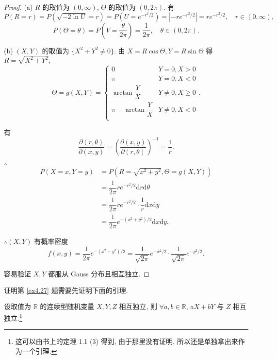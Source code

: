 \documentclass{ctexart}
\begin{document}
\begin{proof}
    (a) $R$ 的取值为 $(0,\infty)$, $\Theta$ 的取值为 $(0,2\pi)$. 有
    \[P(R=r)=P(\sqrt{-2\ln U}=r)=P(U=e^{-r^2/2})=|-re^{-r^2/2}|=re^{-r^2/2},\quad r\in(0,\infty),\]
    \[P(\Theta=\theta)=P\left(V=\dfrac{\theta}{2\pi}\right)=\dfrac{1}{2\pi},\quad\theta\in(0,2\pi).\]

    (b) $(X,Y)$ 的取值为 $\{X^2+Y^2\neq0\}$. 由 $X=R\cos\Theta,Y=R\sin\Theta$ 得 $R=\sqrt{X^2+Y^2}$,
    \[\Theta=g(X,Y)=\begin{cases}
        0 & Y=0,X>0 \\
        \pi & Y=0,X<0 \\
        \arctan\dfrac{Y}{X} & Y\neq0,X\geq0 \\
        \pi-\arctan\dfrac{Y}{X} & Y\neq0,X<0 \\
    \end{cases}.\]

    有
    \[\dfrac{\partial(r,\theta)}{\partial(x,y)}=\left(\dfrac{\partial(x,y)}{\partial(r,\theta)}\right)^{-1}=\dfrac{1}{r}.\]

    $\therefore$
    \begin{align*}
        P(X=x,Y=y) & =P(R=\sqrt{x^2+y^2},\Theta=g(X,Y)) \\
        & =\dfrac{1}{2\pi}re^{-r^2/2}\mathrm{d}r\mathrm{d}\theta \\
        & =\dfrac{1}{2\pi}re^{-r^2/2}\cdot\dfrac{1}{r}\mathrm{d}x\mathrm{d}y \\
        & =\dfrac{1}{2\pi}e^{-(x^2+y^2)/2}\mathrm{d}x\mathrm{d}y.
    \end{align*}

    $\therefore(X,Y)$ 有概率密度
    \[f(x,y)=\dfrac{1}{2\pi}e^{-(x^2+y^2)/2}=\dfrac{1}{\sqrt{2\pi}}e^{-x^2/2}\cdot\dfrac{1}{\sqrt{2\pi}}e^{-y^2/2}.\]

    容易验证 $X,Y$ 都服从 Gauss 分布且相互独立.
\end{proof}
证明第 \ref{ex4.27} 题需要先证明下面的引理.
\begin{lemma}\label{l8.1}
    设取值为 $\mathbb{R}$ 的连续型随机变量 $X,Y,Z$ 相互独立, 则 $\forall a,b\in\mathbb{R}$, $aX+bY$ 与 $Z$ 相互独立.\footnote{这可以由书上的定理 1.1 (3) 得到, 由于那里没有证明, 所以还是单独拿出来作为一个引理.}
\end{lemma}
\end{document}
